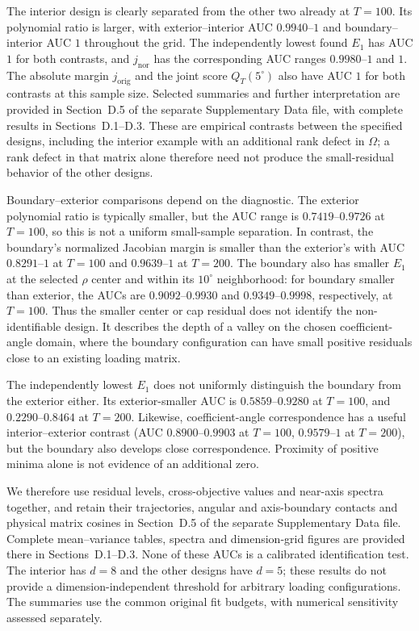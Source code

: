 \documentclass[12pt,letterpaper]{article}
\theoremstyle{plain}
\theoremstyle{definition}
\begin{document}
The interior design is clearly separated from the other two already
at $T=100$. Its polynomial ratio is larger, with exterior--interior
AUC $0.9940$--$1$ and boundary--interior AUC $1$ throughout the grid.
The independently lowest found $E_1$ has AUC $1$ for both contrasts,
and $j_{\mathrm{nor}}$ has the corresponding AUC ranges
$0.9980$--$1$ and $1$. The absolute margin $j_{\mathrm{orig}}$
and the joint score $Q_T(5^\circ)$ also have AUC $1$ for both
contrasts at this sample size. Selected summaries and further
interpretation are provided in Section~D.5 of the separate
Supplementary Data file, with complete results in Sections~D.1--D.3.
These are empirical contrasts between the specified designs,
including the interior example with an additional rank defect in
$\Omega$; a rank defect in that matrix alone therefore need not
produce the small-residual behavior of the other designs.

Boundary--exterior comparisons depend on the diagnostic. The
exterior polynomial ratio is typically smaller, but the AUC range
is $0.7419$--$0.9726$ at $T=100$, so this is not a uniform
small-sample separation. In contrast, the boundary's normalized
Jacobian margin is smaller than the exterior's with AUC
$0.8291$--$1$ at $T=100$ and $0.9639$--$1$ at $T=200$.
The boundary also has smaller $E_1$ at the selected $\rho$ center
and within its $10^\circ$ neighborhood: for boundary smaller than
exterior, the AUCs are $0.9092$--$0.9930$ and
$0.9349$--$0.9998$, respectively, at $T=100$.
Thus the smaller center or cap residual does not identify the
non-identifiable design. It describes the depth of a valley on the
chosen coefficient-angle domain, where the boundary configuration
can have small positive residuals close to an existing loading
matrix.

The independently lowest $E_1$ does not uniformly distinguish the
boundary from the exterior either. Its exterior-smaller AUC is
$0.5859$--$0.9280$ at $T=100$, and $0.2290$--$0.8464$ at
$T=200$. Likewise, coefficient-angle correspondence has a useful
interior--exterior contrast (AUC $0.8900$--$0.9903$ at $T=100$,
$0.9579$--$1$ at $T=200$), but the boundary also develops close
correspondence. Proximity of positive minima alone is not evidence
of an additional zero.

We therefore use residual levels, cross-objective values and
near-axis spectra together, and retain their trajectories, angular
and axis-boundary contacts and physical matrix cosines in
Section~D.5 of the separate Supplementary Data file. Complete
mean--variance tables, spectra and dimension-grid figures are
provided there in Sections~D.1--D.3.
None of these AUCs is a calibrated identification test. The interior
has $d=8$ and the other designs have $d=5$; these results do not
provide a dimension-independent threshold for arbitrary loading
configurations. The summaries use the common original fit budgets,
with numerical sensitivity assessed separately.
\end{document}
